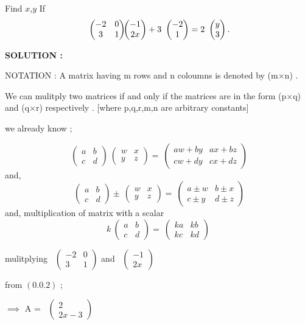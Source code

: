 \documentclass[journal,12pt,twocolumn]{IEEEtran}
\theoremstyle{remark}
\newcommand{\myvec}[1]{\ensuremath{\begin{pmatrix}#1\end{pmatrix}}}
\numberwithin{equation}{subsection}
\begin{document}
  Find \hspace{0.05cm}$x$,$ y $ \hspace{0.25cm}       
       If 
       \begin{align}
       \ \myvec{-2 & 0\\3 & 1} \hspace{-0.25cm}
\ \myvec{-1\\2x}  
 + 3\ \myvec{-2 \\1 } 
 = 2\ \myvec{y \\3 } .
        \end{align}

  \bigskip
  \textbf{SOLUTION : }  
  
  {NOTATION : } A matrix having m rows and n coloumns is denoted by (m$\times$n) .
  
  We can mulitply two matrices if and only if the matrices are in the form (p$\times$q) and (q$\times$r) respectively .
   [where p,q,r,m,n are arbitrary constants]
   
  we already know ;
    
    \begin{equation}
       \ \myvec{a & b \\c & d } 
      \ \myvec{w & x \\y & z } 
      =
       \ \myvec{aw+ by & ax+ bz \\cw+ dy& cx+ dz} 
    \end{equation}
    and,
    \begin{equation}
      \ \myvec{a & b \\c & d } 
      \pm
      \ \myvec{w & x \\y & z } 
      =
       \ \myvec{a\pm w & b\pm x \\c\pm y& d\pm z} 
    \end{equation}
    and,
    multiplication of matrix with a scalar
    \begin{equation}
     k \ \myvec{a & b \\c & d } 
      =
       \ \myvec{ka & kb \\kc & kd } 
    \end{equation}
    
   mulitplying \ \myvec{-2 & 0 \\3 & 1 } 
      and 
      \ \myvec{-1 \\2x }
      
     from $(0.0.2)$ ;
      
      $\implies$  A = \ \myvec{2 \\2x-3 } 
      
\end{document}
